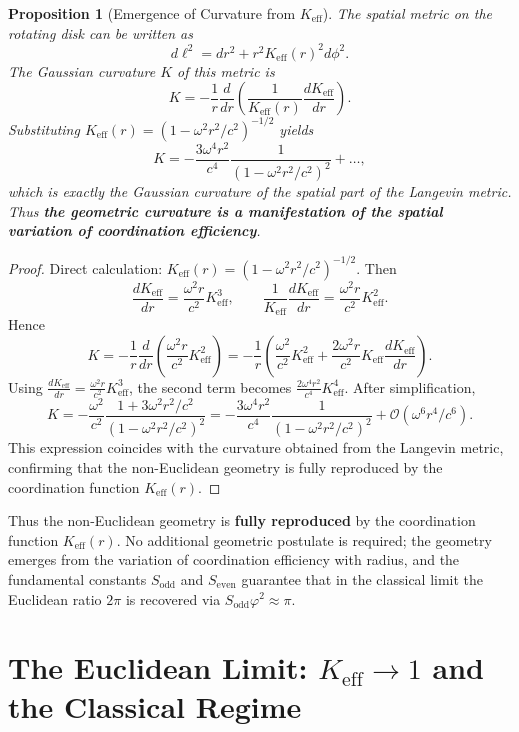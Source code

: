 \documentclass[12pt,a4paper]{article}
\newtheorem{proposition}{Proposition}[section]
\newcommand{\Sodd}{S_{\mathrm{odd}}}
\newcommand{\Seven}{S_{\mathrm{even}}}
\begin{document}
	\begin{proposition}[Emergence of Curvature from \(K_{\mathrm{eff}}\)]
		The spatial metric on the rotating disk can be written as
		\[
		d\ell^2 = dr^2 + r^2 K_{\mathrm{eff}}(r)^2 d\phi^2.
		\]
		The Gaussian curvature \(K\) of this metric is
		\[
		K = -\frac{1}{r} \frac{d}{dr}\left( \frac{1}{K_{\mathrm{eff}}(r)} \frac{dK_{\mathrm{eff}}}{dr} \right).
		\]
		Substituting \(K_{\mathrm{eff}}(r) = (1 - \omega^2 r^2/c^2)^{-1/2}\) yields
		\[
		K = -\frac{3\omega^4 r^2}{c^4} \frac{1}{(1 - \omega^2 r^2/c^2)^2} + \dots,
		\]
		which is exactly the Gaussian curvature of the spatial part of the Langevin metric. Thus \textbf{the geometric curvature is a manifestation of the spatial variation of coordination efficiency}.
	\end{proposition}
	
	\begin{proof}
		Direct calculation: \(K_{\mathrm{eff}}(r) = (1 - \omega^2 r^2/c^2)^{-1/2}\). Then
		\[
		\frac{dK_{\mathrm{eff}}}{dr} = \frac{\omega^2 r}{c^2} K_{\mathrm{eff}}^3,\qquad
		\frac{1}{K_{\mathrm{eff}}} \frac{dK_{\mathrm{eff}}}{dr} = \frac{\omega^2 r}{c^2} K_{\mathrm{eff}}^2.
		\]
		Hence
		\[
		K = -\frac{1}{r} \frac{d}{dr}\left( \frac{\omega^2 r}{c^2} K_{\mathrm{eff}}^2 \right) = -\frac{1}{r} \left( \frac{\omega^2}{c^2} K_{\mathrm{eff}}^2 + \frac{2\omega^2 r}{c^2} K_{\mathrm{eff}} \frac{dK_{\mathrm{eff}}}{dr} \right).
		\]
		Using \(\frac{dK_{\mathrm{eff}}}{dr} = \frac{\omega^2 r}{c^2} K_{\mathrm{eff}}^3\), the second term becomes \(\frac{2\omega^4 r^2}{c^4} K_{\mathrm{eff}}^4\). After simplification,
		\[
		K = -\frac{\omega^2}{c^2} \frac{1 + 3\omega^2 r^2/c^2}{(1 - \omega^2 r^2/c^2)^2} = -\frac{3\omega^4 r^2}{c^4} \frac{1}{(1 - \omega^2 r^2/c^2)^2} + \mathcal{O}(\omega^6 r^4/c^6).
		\]
		This expression coincides with the curvature obtained from the Langevin metric, confirming that the non-Euclidean geometry is fully reproduced by the coordination function \(K_{\mathrm{eff}}(r)\).
	\end{proof}
	
	Thus the non-Euclidean geometry is \textbf{fully reproduced} by the coordination function \(K_{\mathrm{eff}}(r)\). No additional geometric postulate is required; the geometry emerges from the variation of coordination efficiency with radius, and the fundamental constants \(\Sodd\) and \(\Seven\) guarantee that in the classical limit the Euclidean ratio \(2\pi\) is recovered via \(\Sodd \varphi^2 \approx \pi\).
	
	\section{The Euclidean Limit: \(K_{\mathrm{eff}} \to 1\) and the Classical Regime}
	\label{sec:euc-limit}
	
\end{document}
